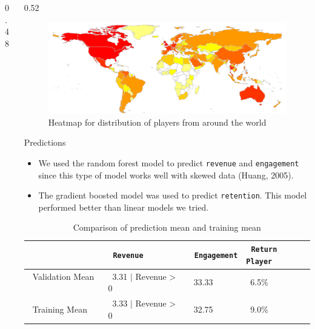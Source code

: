\documentclass[final,size=a3]{beamer}
\newlength{\threecolwid}
\begin{document}
\begin{frame}[t]
\begin{columns}[t]
\begin{column}{\threecolwid}
\begin{columns}[t]
\begin{column}{0.48\threecolwid}
\vspace{5mm}

\end{column} %

\begin{column}{0.52\threecolwid}

\vspace{-25mm}

\begin{figure}[h]
\caption{Heatmap for distribution of players from around the world}
\vspace{5mm}
\includegraphics[scale=0.7]{images/world}
\end{figure}

\vspace{5mm}
\begin{block}{Predictions}

\begin{itemize}
\item We used the random forest model to predict \texttt{revenue} and \texttt{engagement} since this type of model works well with skewed data (Huang, 2005).
\item The gradient boosted model was used to predict \texttt{retention}. This model performed better than linear models we tried.
\end{itemize}

\vspace{-9mm}
\medskip
\def\arraystretch{1.4}
\begin{table}[h]
\caption{Comparison of prediction mean and training mean}
\vspace{3mm}
\begin{tabular}{|l| l l l|}
\hline 
& \ \texttt{Revenue} & \ \texttt{Engagement} & \ \texttt{Return Player} \\ \hline
\ Validation Mean \ & \ 3.31 $|$ Revenue > 0 & \ 33.33 & \ 6.5\% \\ \ Training Mean \ & \ 3.33 $|$ Revenue > 0 & \ 32.75 & \ 9.0\% \\ \hline
\end{tabular}
\vspace{5mm}
\end{table}


\end{block}
\end{column}
\end{columns}
\end{column}
\end{columns}
\end{frame}
\end{document}
